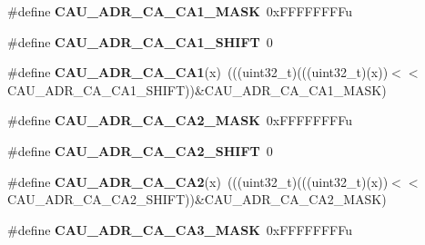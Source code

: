 \begin{DoxyCompactItemize}
\item 
\#define {\bfseries C\+A\+U\+\_\+\+A\+D\+R\+\_\+\+C\+A\+\_\+\+C\+A1\+\_\+\+M\+A\+SK}~0x\+F\+F\+F\+F\+F\+F\+F\+Fu\hypertarget{group__CAU__Register__Masks_gaa06ea4a2e4659354d7720c10f40f491c}{}\label{group__CAU__Register__Masks_gaa06ea4a2e4659354d7720c10f40f491c}

\item 
\#define {\bfseries C\+A\+U\+\_\+\+A\+D\+R\+\_\+\+C\+A\+\_\+\+C\+A1\+\_\+\+S\+H\+I\+FT}~0\hypertarget{group__CAU__Register__Masks_ga0627f84884a77f1e20570b01eacc50e8}{}\label{group__CAU__Register__Masks_ga0627f84884a77f1e20570b01eacc50e8}

\item 
\#define {\bfseries C\+A\+U\+\_\+\+A\+D\+R\+\_\+\+C\+A\+\_\+\+C\+A1}(x)~(((uint32\+\_\+t)(((uint32\+\_\+t)(x))$<$$<$C\+A\+U\+\_\+\+A\+D\+R\+\_\+\+C\+A\+\_\+\+C\+A1\+\_\+\+S\+H\+I\+FT))\&C\+A\+U\+\_\+\+A\+D\+R\+\_\+\+C\+A\+\_\+\+C\+A1\+\_\+\+M\+A\+SK)\hypertarget{group__CAU__Register__Masks_ga2383410eeb89d47fdb25e5e0d0d6049f}{}\label{group__CAU__Register__Masks_ga2383410eeb89d47fdb25e5e0d0d6049f}

\item 
\#define {\bfseries C\+A\+U\+\_\+\+A\+D\+R\+\_\+\+C\+A\+\_\+\+C\+A2\+\_\+\+M\+A\+SK}~0x\+F\+F\+F\+F\+F\+F\+F\+Fu\hypertarget{group__CAU__Register__Masks_ga9294c3d57841472174044b71a5a271ad}{}\label{group__CAU__Register__Masks_ga9294c3d57841472174044b71a5a271ad}

\item 
\#define {\bfseries C\+A\+U\+\_\+\+A\+D\+R\+\_\+\+C\+A\+\_\+\+C\+A2\+\_\+\+S\+H\+I\+FT}~0\hypertarget{group__CAU__Register__Masks_ga3809e21df053cc0fffe5518686527b59}{}\label{group__CAU__Register__Masks_ga3809e21df053cc0fffe5518686527b59}

\item 
\#define {\bfseries C\+A\+U\+\_\+\+A\+D\+R\+\_\+\+C\+A\+\_\+\+C\+A2}(x)~(((uint32\+\_\+t)(((uint32\+\_\+t)(x))$<$$<$C\+A\+U\+\_\+\+A\+D\+R\+\_\+\+C\+A\+\_\+\+C\+A2\+\_\+\+S\+H\+I\+FT))\&C\+A\+U\+\_\+\+A\+D\+R\+\_\+\+C\+A\+\_\+\+C\+A2\+\_\+\+M\+A\+SK)\hypertarget{group__CAU__Register__Masks_ga2e2a6bd48203a8f976196d023b1acec0}{}\label{group__CAU__Register__Masks_ga2e2a6bd48203a8f976196d023b1acec0}

\item 
\#define {\bfseries C\+A\+U\+\_\+\+A\+D\+R\+\_\+\+C\+A\+\_\+\+C\+A3\+\_\+\+M\+A\+SK}~0x\+F\+F\+F\+F\+F\+F\+F\+Fu\hypertarget{group__CAU__Register__Masks_ga32fe7c3ce489038db5a7614ff6c376d2}{}\label{group__CAU__Register__Masks_ga32fe7c3ce489038db5a7614ff6c376d2}


\end{DoxyCompactItemize}
